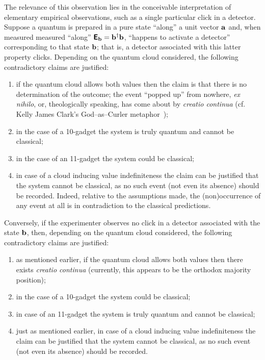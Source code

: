 \documentclass[%
  reprint,
  twocolumn,
 showpacs,
 showkeys,
 preprintnumbers,
 amsmath,amssymb,
 aps,
  prl,
  longbibliography,
 ]{revtex4-1}
\begin{document}
The relevance of this observation lies in the conceivable interpretation of elementary empirical observations,
such as a single particular click in a detector.
Suppose a quantum is prepared in a pure state ``along'' a unit vector ${\bf a}$ and, when measured measured ``along''
$\textsf{\textbf{E}}_{\bf b}={\bf b}^\dagger  {\bf b}$,
``happens to activate a detector'' corresponding to that state ${\bf b}$;
that is, a detector associated with this latter property clicks.
Depending on the quantum cloud considered, the following contradictory claims are justified:
\begin{enumerate}
\item
if the quantum cloud allows both values then the claim is that there is no determination of the outcome; the event ``popped up'' from nowhere, {\it ex nihilo},
or, theologically speaking, has come about by {\it creatio continua} (cf. Kelly James Clark's God--as--Curler metaphor~\cite{Clark-2017-GodAsCurler});
\item
in the case of a 10-gadget the system is truly quantum and cannot be classical;
\item
in the case of an 11-gadget the  system could be classical;
\item
in case of a cloud inducing value indefiniteness the claim can be justified that the system cannot be classical, as no such event (not even its absence)
should be recorded. Indeed, relative to the assumptions made, the (non)occurrence of any event at all is in contradiction to the classical predictions.
\end{enumerate}
Conversely, if the experimenter observes no click in a detector associated with the  state $  {\bf b} $,
then, depending on the quantum cloud considered, the following contradictory claims are justified:
\begin{enumerate}
\item
as mentioned earlier, if the quantum cloud allows both values then there exists {\it creatio continua}
(currently, this appears to be the orthodox majority position);
\item
in the case of a 10-gadget the system could be classical;
\item
in case of an 11-gadget the system is truly quantum and cannot be classical;
\item
just as mentioned earlier, in case of a cloud inducing value indefiniteness the claim can be justified that the system cannot be classical, as no such event (not even its absence)
should be recorded.
\end{enumerate}
\end{document}
